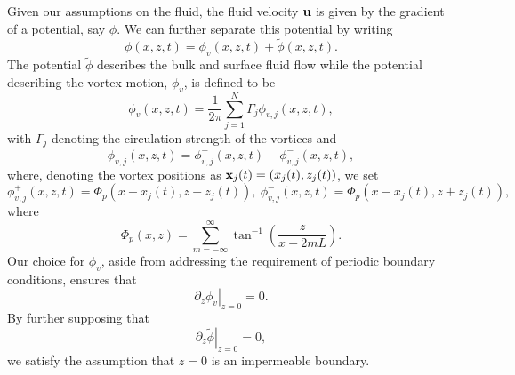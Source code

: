 \documentclass[a4paper,11pt]{article}
\newcommand{\p}{\partial}
\begin{document}
Given our assumptions on the fluid, the fluid velocity ${\bf u}$ is given by the gradient of a potential, say $\phi$.  We can further separate this potential by writing 
\[
\phi(x,z,t) = \phi_{v}(x,z,t) + \tilde{\phi}(x,z,t).
\]
The potential $\tilde{\phi}$ describes the bulk and surface fluid flow while the potential describing the vortex motion, $\phi_{v}$, is defined to be
\begin{equation}
\phi_{v}(x,z,t) = \frac{1}{2\pi}\sum_{j=1}^{N}\Gamma_{j} \phi_{v,j}(x,z,t),
\label{vortpoten}
\end{equation}
with $\Gamma_{j}$ denoting the circulation strength of the vortices and
\[
\phi_{v,j}(x,z,t) = \phi_{v,j}^{+}(x,z,t) - \phi_{v,j}^{-}(x,z,t), 
\]
where, denoting the vortex positions as ${\bf x}_{j}(t) = \left(x_{j}(t),z_{j}(t)\right)$, we set 
\[
\phi_{v,j}^{+}(x,z,t) = \Phi_{p}(x-x_{j}(t),z-z_{j}(t)), ~ \phi_{v,j}^{-}(x,z,t) = \Phi_{p}(x-x_{j}(t),z+z_{j}(t)), 
\]
where
\[
\Phi_{p}(x,z) = \sum_{m=-\infty}^{\infty} \tan^{-1}\left(\frac{z}{x-2m L} \right).
\]
Our choice for $\phi_{v}$, aside from addressing the requirement of periodic boundary conditions, ensures that 
\[
\left.\p_{z}\phi_{v}\right|_{z=0} = 0.
\]
By further supposing that 
\[
\left.\p_{z}\tilde{\phi}\right|_{z=0} = 0, 
\]
we satisfy the assumption that $z=0$ is an impermeable boundary.  
\end{document}
